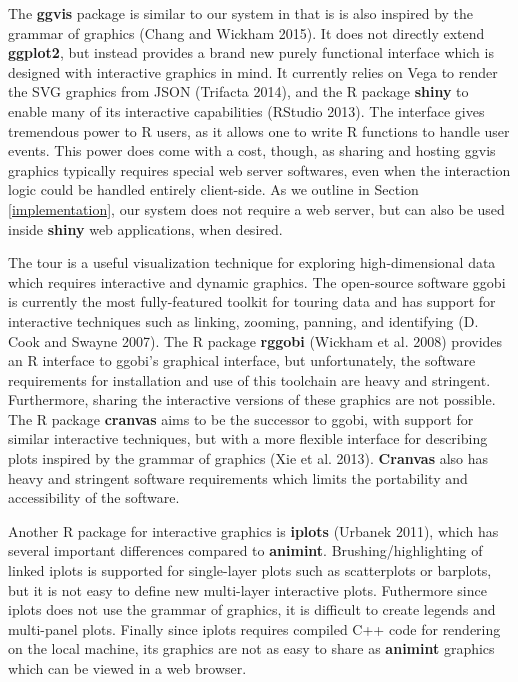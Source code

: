 \documentclass[12pt,]{article}
\theoremstyle{definition}
\theoremstyle{definition}
\theoremstyle{definition}
\theoremstyle{remark}
\begin{document}
The \textbf{ggvis} package is similar to our system in that is is also
inspired by the grammar of graphics (Chang and Wickham 2015). It does
not directly extend \textbf{ggplot2}, but instead provides a brand new
purely functional interface which is designed with interactive graphics
in mind. It currently relies on Vega to render the SVG graphics from
JSON (Trifacta 2014), and the R package \textbf{shiny} to enable many of
its interactive capabilities (RStudio 2013). The interface gives
tremendous power to R users, as it allows one to write R functions to
handle user events. This power does come with a cost, though, as sharing
and hosting ggvis graphics typically requires special web server
softwares, even when the interaction logic could be handled entirely
client-side. As we outline in Section \ref{implementation}, our system
does not require a web server, but can also be used inside
\textbf{shiny} web applications, when desired.

The tour is a useful visualization technique for exploring
high-dimensional data which requires interactive and dynamic graphics.
The open-source software ggobi is currently the most fully-featured
toolkit for touring data and has support for interactive techniques such
as linking, zooming, panning, and identifying (D. Cook and Swayne 2007).
The R package \textbf{rggobi} (Wickham et al. 2008) provides an R
interface to ggobi's graphical interface, but unfortunately, the
software requirements for installation and use of this toolchain are
heavy and stringent. Furthermore, sharing the interactive versions of
these graphics are not possible. The R package \textbf{cranvas} aims to
be the successor to ggobi, with support for similar interactive
techniques, but with a more flexible interface for describing plots
inspired by the grammar of graphics (Xie et al. 2013). \textbf{Cranvas}
also has heavy and stringent software requirements which limits the
portability and accessibility of the software.

Another R package for interactive graphics is \textbf{iplots} (Urbanek
2011), which has several important differences compared to
\textbf{animint}. Brushing/highlighting of linked iplots is supported
for single-layer plots such as scatterplots or barplots, but it is not
easy to define new multi-layer interactive plots. Futhermore since
iplots does not use the grammar of graphics, it is difficult to create
legends and multi-panel plots. Finally since iplots requires compiled
C++ code for rendering on the local machine, its graphics are not as
easy to share as \textbf{animint} graphics which can be viewed in a web
browser.
\end{document}
